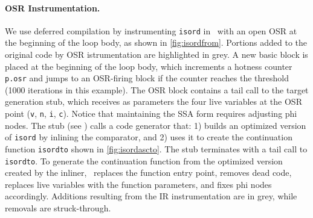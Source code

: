 \paragraph{OSR Instrumentation.}
We use deferred compilation by instrumenting {\tt isord} in \tinyvm\ with an open OSR at the beginning of the loop body, as shown in \myfigure\ref{fig:isordfrom}. Portions added to the original code by OSR istrumentation are highlighted in grey.
A new basic block is placed at the beginning of the loop body, which increments a hotness counter {\tt p.osr} and jumps to an OSR-firing block if the counter reaches the threshold (1000 iterations in this example). The OSR block contains a tail call to the target generation stub, which receives as parameters the four live variables at the OSR point ({\tt v}, {\tt n}, {\tt i}, {\tt c}). Notice that maintaining the SSA form requires adjusting phi nodes. The stub (see \myfigure[...]) calls a code generator that: 1) builds an optimized version of {\tt isord} by inlining the comparator, and 2) uses it to create the continuation function {\tt isordto} shown in \myfigure\ref{fig:isordascto}. The stub terminates with a tail call to {\tt isordto}. To generate the continuation function from the optimized version created by the inliner, \tinyvm\ replaces the function entry point, removes dead code, replaces live variables with the function parameters, and fixes phi nodes accordingly. Additions resulting from the IR instrumentation are in grey, while removals are struck-through.

